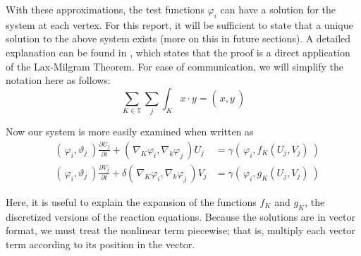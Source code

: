 \documentclass[12pt]{article}
\begin{document}
With these approximations, the test functions $\varphi_i$ can have a solution for the system at each vertex. For this report, it will be sufficient to state that a unique solution to the above system exists (more on this in future sections). A detailed explanation can be found in \cite{Dziuk2013}, which states that the proof is a direct application of the Lax-Milgram Theorem. For ease of communication, we will simplify the notation here as follows:
$$ \sum_{K\in\mathbb{T}}\sum_j\int_K x\cdot y = \left(\frac{}{}x,y~\right) $$

\noindent Now our system is more easily examined when written as
\begin{equation}\label{eq:simp}
\begin{aligned}
&\left(\frac{}{}\varphi_i,\vartheta_j~\right)\frac{\partial U_j}{\partial t} + \left(\frac{}{}\nabla_K\varphi_i, \nabla_k\varphi_j~\right) U_j &= \gamma \left(\frac{}{}\varphi_i, f_K(U_j, V_j)~\right) \\
&\left(\frac{}{}\varphi_i,\vartheta_j~\right)\frac{\partial V_j}{\partial t} + \delta\left(\frac{}{}\nabla_K\varphi_i, \nabla_k\varphi_j~\right) V_j &= \gamma \left(\frac{}{}\varphi_i, g_K(U_j, V_j)~\right)
\end{aligned}	
\end{equation} 


Here, it is useful to explain the expansion of the functions $f_K$ and $g_K$, the discretized versions of the reaction equations. Because the solutions are in vector format, we must treat the nonlinear term piecewise; that is, multiply each vector term according to its position in the vector. 
\end{document}

